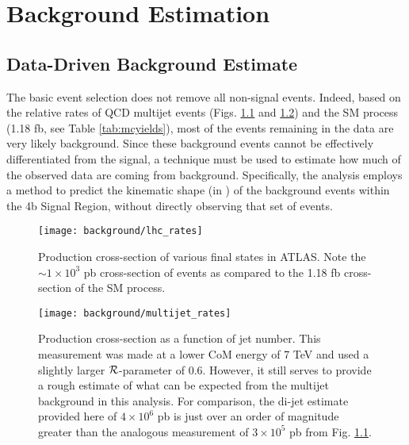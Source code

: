 \chapter{Background Estimation} \label{chapter:background}

\FloatBarrier
\section{Data-Driven Background Estimate}

    The basic event selection does not remove all non-signal events.
    Indeed, based on the relative rates of QCD multijet events (Figs. \ref{fig:lhc_rates} and \ref{fig:multijet_rates}) and the SM \vbfhhproc process (1.18 fb, see Table \ref{tab:mcyields}),
        most of the events remaining in the data are very likely background.
    Since these background events cannot be effectively differentiated from the signal,
        a technique must be used to estimate how much of the observed data are coming from background.
    Specifically, the analysis employs a method to predict the kinematic shape (in \mhh)
        of the background events within the 4b Signal Region,
        without directly observing that set of events.

    \begin{figure}[tbh]
        \texttt{[image: background/lhc\_rates]}
        \caption{
            Production cross-section of various final states in ATLAS\cite{atlas_sm_summary}.
            Note the $\sim 1 \times 10^3$ pb cross-section of \ttbar events
                as compared to the 1.18 fb cross-section of the SM \vbfhhproc process.
        }
        \label{fig:lhc_rates}
    \end{figure}


    \begin{figure}[tbh]
        \texttt{[image: background/multijet\_rates]}
        \caption{
            Production cross-section as a function of jet number\cite{multijet_measurement}.
            This measurement was made at a lower CoM energy of 7 TeV and used a slightly larger
                \antikt $\mathcal{R}$-parameter of 0.6.
            However, it still serves to provide a rough estimate of what can be expected from the multijet
                background in this analysis.
            For comparison, the di-jet estimate provided here of $4\times10^6$ pb
                is just over an order of magnitude greater than the analogous measurement of
                $3\times10^5$ pb from Fig. \ref{fig:lhc_rates}.
        }
        \label{fig:multijet_rates}
    \end{figure}

